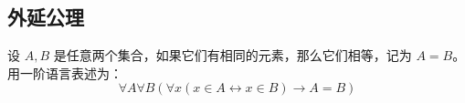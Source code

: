 
\subsection{外延公理}

\begin{axiom}
    \label{axiom_of_extensionality}
    设 $A,B$ 是任意两个集合，如果它们有相同的元素，那么它们相等，记为 $A = B$。用一阶语言表述为：
    \[
        \forall A \forall B \left( \forall x (x \in A \leftrightarrow x \in B) \to A = B \right)
    \]
\end{axiom}